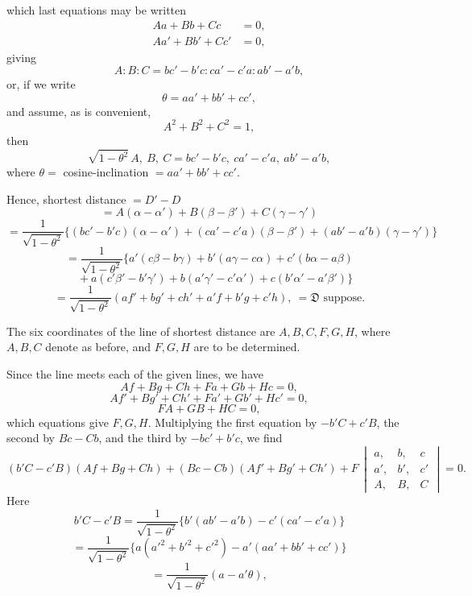 \documentclass[11pt,a4paper]{article}
\begin{document}
\newpage


which last equations may be written
\begin{align*}
Aa + Bb + Cc &= 0,\\
Aa' + Bb' + Cc' &= 0,
\end{align*}
giving
\[
A : B : C = bc' - b'c : ca' - c'a : ab' - a'b,
\]
or, if we write
\[
\theta = aa' + bb' + cc',
\]
and assume, as is convenient,
\[
A^{2} + B^{2} + C^{2} = 1,
\]
then
\[
\sqrt{1 - \theta^{2}}\,A,\ B,\ C = bc' - b'c,\ ca' - c'a,\ ab' - a'b,
\]
where $\theta = $ cosine-inclination $= aa' + bb' + cc'$.

\medskip

Hence, shortest distance $= D' - D$
\[
= A(\alpha - \alpha') + B(\beta - \beta') + C(\gamma - \gamma')
\]
\[
= \frac{1}{\sqrt{1 - \theta^{2}}}\{(bc' - b'c)(\alpha - \alpha') + (ca' - c'a)(\beta - \beta') + (ab' - a'b)(\gamma - \gamma')\}
\]
\[
= \frac{1}{\sqrt{1 - \theta^{2}}}\{a'(c\beta - b\gamma) + b'(a\gamma - c\alpha) + c'(b\alpha - a\beta)
\]
\[
\quad + a(c'\beta' - b'\gamma') + b(a'\gamma' - c'\alpha') + c(b'\alpha' - a'\beta')\}
\]
\[
= \frac{1}{\sqrt{1 - \theta^{2}}}(af' + bg' + ch' + a'f + b'g + c'h),\ = \mathfrak{D}\text{ suppose}.
\]

The six coordinates of the line of shortest distance are $A, B, C, F, G, H$, where $A, B, C$ denote as before, and $F, G, H$ are to be determined.

\medskip

Since the line meets each of the given lines, we have
\[
Af + Bg + Ch + Fa + Gb + Hc = 0,
\]
\[
Af' + Bg' + Ch' + Fa' + Gb' + Hc' = 0,
\]
\[
FA + GB + HC = 0,
\]
which equations give $F, G, H$. Multiplying the first equation by $-b'C + c'B$, the second by $Bc - Cb$, and the third by $-bc' + b'c$, we find
\[
(b'C - c'B)(Af + Bg + Ch) + (Bc - Cb)(Af' + Bg' + Ch') + F\,
\begin{vmatrix} a, & b, & c\\ a', & b', & c'\\ A, & B, & C\end{vmatrix} = 0.
\]
Here
\[
b'C - c'B = \frac{1}{\sqrt{1 - \theta^{2}}}\{b'(ab' - a'b) - c'(ca' - c'a)\}
\]
\[
= \frac{1}{\sqrt{1 - \theta^{2}}}\{a(a'^{2} + b'^{2} + c'^{2}) - a'(aa' + bb' + cc')\}
\]
\[
= \frac{1}{\sqrt{1 - \theta^{2}}}(a - a'\theta),
\]

\newpage

\end{document}
